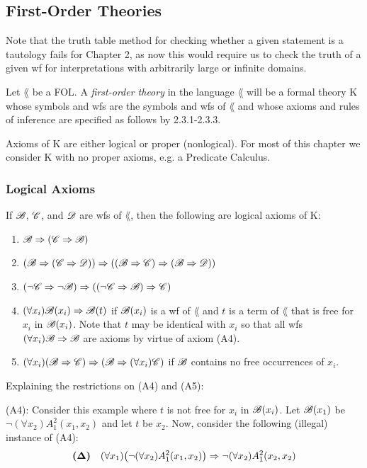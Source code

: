 \subsection{First-Order Theories}

Note that the truth table method for checking whether a given statement is a tautology fails for Chapter 2, as now this would require us to check the truth of a given wf for interpretations with arbitrarily large or infinite domains.

Let $\lang$ be a FOL. A \textit{first-order theory} in the language $\lang$ will be a formal theory K whose symbols and wfs are the symbols and wfs of $\lang$ and whose axioms and rules of inference are specified as follows by 2.3.1-2.3.3.

Axioms of K are either logical or proper (nonlogical). For most of this chapter we consider K with no proper axioms, e.g. a Predicate Calculus.

\subsubsection{Logical Axioms}

If $\mathscr{B}$, $\mathscr{C}$, and $\mathscr{D}$ are wfs of $\lang$, then the following are logical axioms of K:

\begin{enumerate} [label = (A\arabic*)]
    \item $\mathscr{B} \Rightarrow (\mathscr{C} \Rightarrow \mathscr{B})$
    \item $(\mathscr{B} \Rightarrow (\mathscr{C} \Rightarrow \mathscr{D})) \Rightarrow ((\mathscr{B} \Rightarrow \mathscr{C}) \Rightarrow (\mathscr{B} \Rightarrow \mathscr{D}))$
    \item $(\lnot \mathscr{C} \Rightarrow \lnot \mathscr{B}) \Rightarrow ((\lnot \mathscr{C} \Rightarrow \mathscr{B}) \Rightarrow \mathscr{C})$
    \item $(\forall x_i) \mathscr{B}(x_i) \Rightarrow \mathscr{B}(t)$ if $\mathscr{B}(x_i)$ is a wf of $\lang$ and $t$ is a term of $\lang$ that is free for $x_i$ in $\mathscr{B}(x_i)$. Note that $t$ may be identical with $x_i$ so that all wfs $(\forall x_i) \mathscr{B} \Rightarrow \mathscr{B}$ are axioms by virtue of axiom (A4).
    \item $(\forall x_i) (\mathscr{B} \Rightarrow \mathscr{C}) \Rightarrow (\mathscr{B} \Rightarrow (\forall x_i) \mathscr{C})$ if $\mathscr{B}$ contains no free occurrences of $x_i$.
\end{enumerate}

Explaining the restrictions on (A4) and (A5):

(A4): Consider this example where $t$ is not free for $x_i$ in $\mathscr{B}(x_i)$. Let $\mathscr{B}(x_1)$ be $\lnot( \forall x_2) A_1^2(x_1,x_2)$ and let $t$ be $x_2$. Now, consider the following (illegal) instance of (A4):
\[\bm{(\Delta)} \quad (\forall x_1)\big( \lnot (\forall x_2) A_1^2(x_1,x_2) \big) \Rightarrow \lnot( \forall x_2) A_1^2 (x_2, x_2)\]

